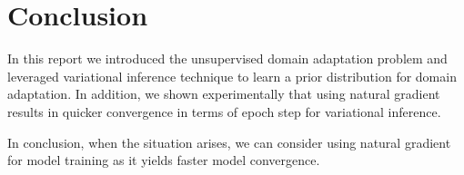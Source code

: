 \documentclass[10pt,twocolumn,letterpaper]{article}
\begin{document}
\section{Conclusion}

In this report we introduced the unsupervised domain adaptation problem and leveraged variational inference technique to learn a prior distribution for domain adaptation.
In addition, we shown experimentally that using natural gradient results in quicker convergence in terms of epoch step for variational inference.

In conclusion, when the situation arises, we can consider using natural gradient for model training as it yields faster model convergence.

{\small


}
\end{document}
